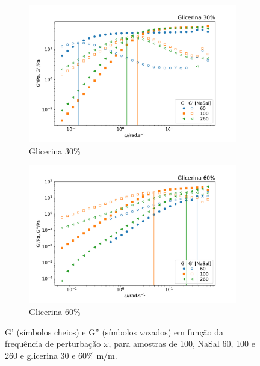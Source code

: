 	\begin{figure}[h]
		\begin{subfigure}[t]{0.5\textwidth}
			\centering
			\includegraphics[width=\textwidth]{imagens/reologia/oscilatorio_glic30p}
			\caption{Glicerina 30\%}
			\label{fig:oscilatorio_glic_30p}
		\end{subfigure} %
		\begin{subfigure}[t]{0.5\textwidth}
			\centering
			\includegraphics[width=\textwidth]{imagens/reologia/oscilatorio_glic60p}
			\caption{Glicerina 60\%}
			\label{fig:oscilatorio_glic_60p}
		\end{subfigure} %
	\caption{G' (símbolos cheios) e G'' (símbolos vazados) em função da frequência de perturbação \(\omega\), para amostras de \CTAB{} 100\mM{}, NaSal 60, 100 e 260\mM{} e glicerina 30 e 60\% m/m.}
	\label{fig:oscilatorio_glicerina}
	\end{figure}

